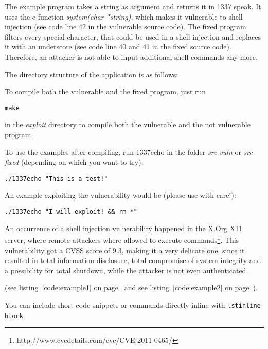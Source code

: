 \documentclass[12pt,a4paper,titlepage,oneside]{scrartcl}
\begin{document}
The example program takes a string as argument and returns it in 1337 speak. It uses the c function
\textit{system(char *string)}, which makes it vulnerable to shell injection (see code line 42 in the vulnerable source code). The fixed program filters
every special character, that could be used in a shell injection and replaces it with an
underscore (see code line 40 and 41 in the fixed source code). Therefore, an attacker is not able to input additional shell commands any more.

The directory structure of the application is as follows:


To compile both the vulnerable and the fixed program, just run

\lstinline{make}

in the \textit{exploit} directory to compile both the vulnerable and the not vulnerable program.

To use the examples after compiling, run 1337echo in the folder \textit{src-vuln} or \textit{src-fixed} (depending on which you want to try):

\lstinline{./1337echo "This is a test!"}

An example exploiting the vulnerability would be (please use with care!):

\lstinline{./1337echo "I will exploit! && rm *"}

An occurrence of a shell injection vulnerability happened in the X.Org X11 server, where remote attackers where allowed to execute commands\footnote{http://www.cvedetails.com/cve/CVE-2011-0465/}. This vulnerability got a CVSS score of 9.3, making it a very delicate one, since it resulted in total information disclosure, total compromise of system integrity and a possibility for total shutdown, while the attacker is not even authenticated.

(\hyperref[code:example1]{see listing~\ref*{code:example1} on page~\pageref*{code:example1}} and \hyperref[code:example2]{see listing~\ref*{code:example2} on page~\pageref*{code:example2}}).

You can include short code snippets or commands directly inline with \lstinline{lstinline block}.

%
\end{document}
